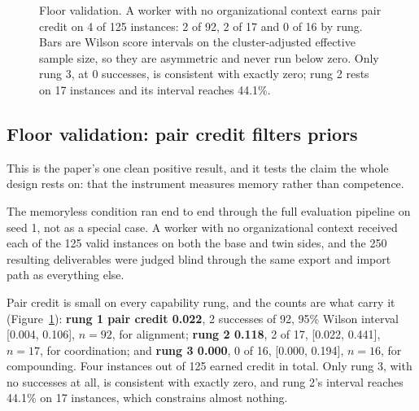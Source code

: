 \documentclass[11pt]{article}
\begin{document}
\begin{figure}[tb]
\centering
{}
\caption{Floor validation. A worker with no organizational context earns pair
credit on 4 of 125 instances: 2 of 92, 2 of 17 and 0 of 16 by rung. Bars are
Wilson score intervals on the cluster-adjusted effective sample size, so they are
asymmetric and never run below zero. Only rung 3, at 0 successes, is consistent
with exactly zero; rung 2 rests on 17 instances and its interval reaches 44.1\%.}
\label{fig:floor}
\end{figure}

\subsection{Floor validation: pair credit filters priors}

This is the paper's one clean positive result, and it tests the claim the whole
design rests on: that the instrument measures memory rather than competence.

The memoryless condition ran end to end through the full evaluation pipeline on
seed 1, not as a special case. A worker with no organizational context received
each of the 125 valid instances on both the base and twin sides, and the 250
resulting deliverables were judged blind through the same export and import path
as everything else.

Pair credit is small on every capability rung, and the counts are what carry it
(Figure~\ref{fig:floor}): \textbf{rung 1 pair credit 0.022}, 2 successes of 92,
95\% Wilson interval [0.004, 0.106], $n=92$, for alignment; \textbf{rung 2
0.118}, 2 of 17, [0.022, 0.441], $n=17$, for coordination; and \textbf{rung 3
0.000}, 0 of 16, [0.000, 0.194], $n=16$, for compounding. Four instances out of
125 earned credit in total. Only rung 3, with no successes at all, is consistent
with exactly zero, and rung 2's interval reaches 44.1\% on 17 instances, which
constrains almost nothing.
\end{document}
